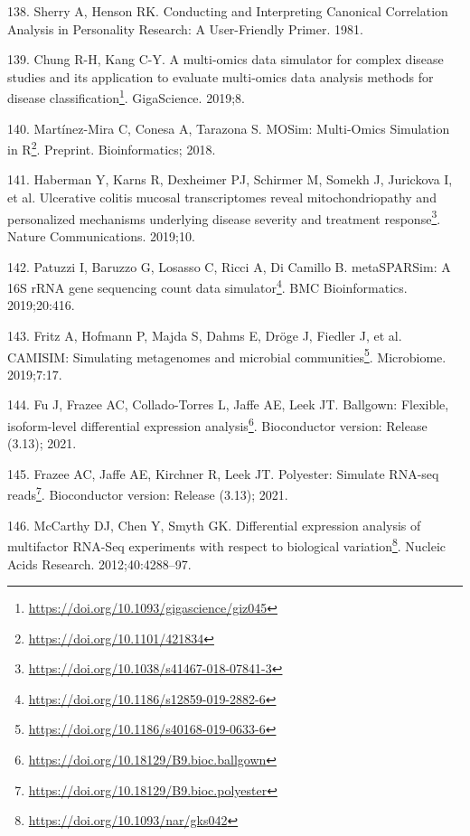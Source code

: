 \documentclass[
  a4paper,
]{book}
\DeclareRobustCommand{\href}[2]{#2\footnote{\url{#1}}}
\newlength{\cslhangindent}
\newlength{\cslentryspacingunit} %
\newenvironment{CSLReferences}[2] %
 {%
  \setlength{\parindent}{0pt}
  \ifodd #1
  \let\oldpar\par
  \def\par{\hangindent=\cslhangindent\oldpar}
  \fi
  \setlength{\parskip}{#2\cslentryspacingunit}
 }%
 {}
\begin{document}
\begin{CSLReferences}{0}{0}
\leavevmode{}%
138. Sherry A, Henson RK. Conducting and {Interpreting Canonical Correlation Analysis} in {Personality Research}: {A User}-{Friendly Primer}. 1981.

\leavevmode{}%
139. Chung R-H, Kang C-Y. \href{https://doi.org/10.1093/gigascience/giz045}{A multi-omics data simulator for complex disease studies and its application to evaluate multi-omics data analysis methods for disease classification}. GigaScience. 2019;8.

\leavevmode{}%
140. Martínez-Mira C, Conesa A, Tarazona S. \href{https://doi.org/10.1101/421834}{{MOSim}: {Multi}-{Omics Simulation} in {R}}. Preprint. {Bioinformatics}; 2018.

\leavevmode{}%
141. Haberman Y, Karns R, Dexheimer PJ, Schirmer M, Somekh J, Jurickova I, et al. \href{https://doi.org/10.1038/s41467-018-07841-3}{Ulcerative colitis mucosal transcriptomes reveal mitochondriopathy and personalized mechanisms underlying disease severity and treatment response}. Nature Communications. 2019;10.

\leavevmode{}%
142. Patuzzi I, Baruzzo G, Losasso C, Ricci A, Di Camillo B. \href{https://doi.org/10.1186/s12859-019-2882-6}{metaSPARSim: A 16S rRNA gene sequencing count data simulator}. BMC Bioinformatics. 2019;20:416.

\leavevmode{}%
143. Fritz A, Hofmann P, Majda S, Dahms E, Dröge J, Fiedler J, et al. \href{https://doi.org/10.1186/s40168-019-0633-6}{CAMISIM: Simulating metagenomes and microbial communities}. Microbiome. 2019;7:17.

\leavevmode{}%
144. Fu J, Frazee AC, Collado-Torres L, Jaffe AE, Leek JT. \href{https://doi.org/10.18129/B9.bioc.ballgown}{Ballgown: Flexible, isoform-level differential expression analysis}. Bioconductor version: Release (3.13); 2021.

\leavevmode{}%
145. Frazee AC, Jaffe AE, Kirchner R, Leek JT. \href{https://doi.org/10.18129/B9.bioc.polyester}{Polyester: Simulate RNA-seq reads}. Bioconductor version: Release (3.13); 2021.

\leavevmode{}%
146. McCarthy DJ, Chen Y, Smyth GK. \href{https://doi.org/10.1093/nar/gks042}{Differential expression analysis of multifactor RNA-Seq experiments with respect to biological variation}. Nucleic Acids Research. 2012;40:4288--97.


\end{CSLReferences}
\end{document}
